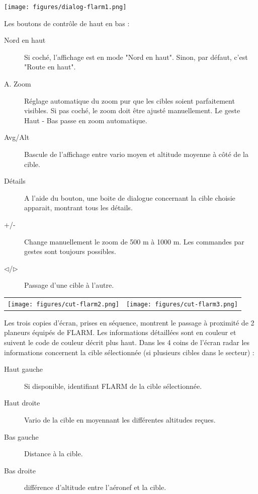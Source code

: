 \begin{center}
\texttt{[image: figures/dialog-flarm1.png]}
\end{center}

Les boutons de contrôle de haut en bas :
\begin{description}
\item[Nord en haut]  Si coché, l'affichage est en mode "Nord en haut". Sinon, par défaut, c'est "Route en haut".
\item[A. Zoom]   Réglage automatique du zoom pur que les cibles soient parfaitement visibles. Si pas coché, le zoom doit être ajusté manuellement. Le geste Haut - Bas passe en zoom automatique.
\item[Avg/Alt]   Bascule de l'affichage entre vario moyen et altitude moyenne à côté de la cible.
\item[Détails]   A l'aide du bouton, une boite de dialogue concernant la cible choisie apparait, montrant tous les détails.
\item[+/-]   Change manuellement le zoom de 500 m à 1000 m. Les commandes par gestes sont toujours possibles.
\item[$\triangleleft$/$\triangleright$]   Passage d'une cible à l'autre.
\end{description}

\begin{center}
\begin{tabular}{c c}
\texttt{[image: figures/cut-flarm2.png]}&
\texttt{[image: figures/cut-flarm3.png]}\\
\end{tabular}
\end{center}
Les trois copies d'écran, prises en séquence, montrent le passage à proximité de 2 planeurs équipés de FLARM. Les informations détaillées sont en couleur et suivent le code de couleur décrit plus haut.
Dans les 4 coins de l'écran radar les informations concernent la cible sélectionnée (si plusieurs cibles dans le secteur) :
\begin{description}
\item[Haut gauche]  Si disponible, identifiant FLARM de la cible sélectionnée.
\item[Haut droite]  Vario de la cible en moyennant les différentes altitudes reçues.
\item[Bas gauche]  Distance à la cible.
\item[Bas droite]  différence d'altitude entre l'aéronef et la cible.
\end{description}

